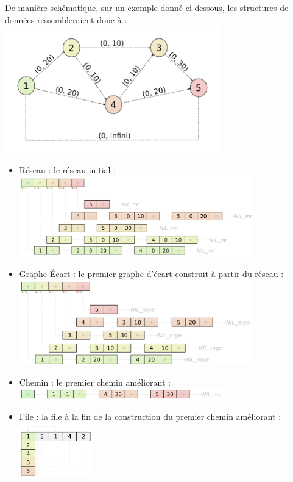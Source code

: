 \documentclass[11pt, a4paper]{report}
\begin{document}
	\pagebreak
	De manière schématique, sur un exemple donné ci-dessous, les structures de données ressembleraient donc à :\\
	\includegraphics[width=0.7\textwidth]{images/R3.png}\\
	\begin{itemize}
        \item Réseau : le réseau initial :\\
		\includegraphics[width=0.8\textwidth]{images/sch_reseau.png}\\

        \item Graphe Écart : le premier graphe d'écart construit à partir du réseau :\\
		\includegraphics[width=0.8\textwidth]{images/sch_graphe_ecart.png}\\

        \item Chemin : le premier chemin améliorant :\\
		\includegraphics[width=0.7\textwidth]{images/sch_chemin.png}\\

		\pagebreak
        \item File : la file à la fin de la construction du premier chemin améliorant :\\
		\includegraphics[width=0.25\textwidth]{images/sch_file.png}\\
	\end{itemize}
\end{document}
